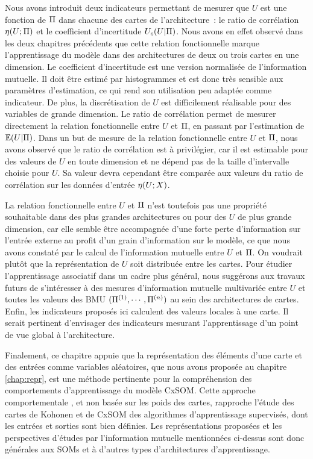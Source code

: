 \documentclass[../main]{subfiles}
\begin{document}
Nous avons introduit deux indicateurs permettant de mesurer que $U$ est une fonction de $\Pi$ dans chacune des cartes de l'architecture~: le ratio de corrélation $\eta(U;\Pi)$ et le coefficient d'incertitude $U_c(U|\Pi)$.
Nous avons en effet observé dans les deux chapitres précédents que cette relation fonctionnelle marque l'apprentissage du modèle dans des architectures de deux ou trois cartes en une dimension.
Le coefficient d'incertitude est une version normalisée de l'information mutuelle. Il doit être estimé par histogrammes et est donc très sensible aux paramètres d'estimation, ce qui rend son utilisation peu adaptée comme indicateur. De plus, la discrétisation de $U$ est difficilement réalisable pour des variables de grande dimension.
Le ratio de corrélation permet de mesurer directement la relation fonctionnelle entre $U$ et $\Pi$, en passant par l'estimation de $\mathbb{E}(U|\Pi)$.
Dans un but de mesure de la relation fonctionnelle entre $U$ et $\Pi$, nous avons observé que le ratio de corrélation est à privilégier, car il est estimable pour des valeurs de $U$ en toute dimension et ne dépend pas de la taille d'intervalle choisie pour $U$. Sa valeur devra cependant être comparée aux valeurs du ratio de corrélation sur les données d'entrée $\eta(U;X)$.

La relation fonctionnelle entre $U$ et $\Pi$ n'est toutefois pas une propriété souhaitable dans des plus grandes architectures ou pour des $U$ de plus grande dimension, car elle semble être accompagnée d'une forte perte d'information sur l'entrée externe au profit d'un grain d'information sur le modèle, ce que nous avons constaté par le calcul de l'information mutuelle entre $U$ et $\Pi$.
On voudrait plutôt que la représentation de $U$ soit distribuée entre les cartes.
Pour étudier l'apprentissage associatif dans un cadre plus général, nous suggérons aux travaux futurs de s'intéresser à des mesures d'information mutuelle multivariée entre $U$ et toutes les valeurs des BMU $(\Pi^{({1})}, \cdots, \Pi^{({n})})$ au sein des architectures de cartes.
Enfin, les indicateurs proposés ici calculent des valeurs locales à une carte. Il serait pertinent d'envisager des indicateurs mesurant l'apprentissage d'un point de vue global à l'architecture.

Finalement, ce chapitre appuie que la représentation des éléments d'une carte et des entrées comme variables aléatoires, que nous avons proposée au chapitre \ref{chap:repr}, est une méthode pertinente pour la compréhension des comportements d'apprentissage du modèle CxSOM.
Cette approche \og comportementale \fg{}, et non basée sur les poids des cartes, rapproche l'étude des cartes de Kohonen et de CxSOM des algorithmes d'apprentissage supervisés, dont les entrées et sorties sont bien définies.
Les représentations proposées et les perspectives d'études par l'information mutuelle mentionnées ci-dessus sont donc générales aux SOMs et à d'autres types d'architectures d'apprentissage. 

\ifSubfilesClassLoaded{
    \printbibliography
}{}
\end{document}
